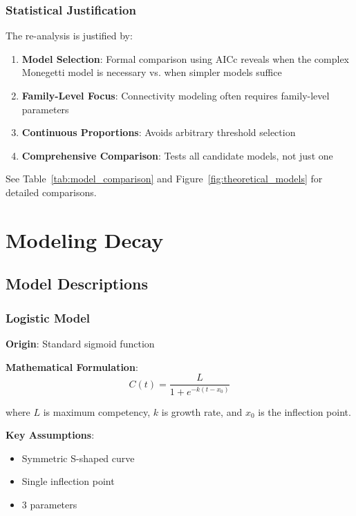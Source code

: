 \documentclass[11pt]{article}
\begin{document}
\subsubsection{Statistical Justification}

The re-analysis is justified by:

\begin{enumerate}
    \item \textbf{Model Selection}: Formal comparison using AICc reveals when the complex Monegetti model is necessary vs. when simpler models suffice
    \item \textbf{Family-Level Focus}: Connectivity modeling often requires family-level parameters
    \item \textbf{Continuous Proportions}: Avoids arbitrary threshold selection
    \item \textbf{Comprehensive Comparison}: Tests all candidate models, not just one
\end{enumerate}

See Table~\ref{tab:model_comparison} and Figure~\ref{fig:theoretical_models} for detailed comparisons.

\section{Modeling Decay}

\subsection{Model Descriptions}

\subsubsection{Logistic Model}

\textbf{Origin}: Standard sigmoid function

\textbf{Mathematical Formulation}:
\begin{equation}
C(t) = \frac{L}{1 + e^{-k(t - x_0)}}
\end{equation}

where $L$ is maximum competency, $k$ is growth rate, and $x_0$ is the inflection point.

\textbf{Key Assumptions}:
\begin{itemize}
    \item Symmetric S-shaped curve
    \item Single inflection point
    \item 3 parameters
\end{itemize}
\end{document}
